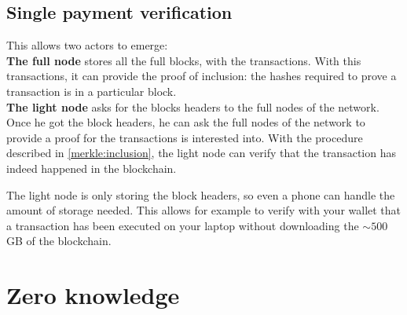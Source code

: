 \subsection{Single payment verification}
This allows two actors to emerge: \\
\textbf{The full node} stores all the full blocks, with the transactions. With this transactions, it can provide the proof of inclusion: the hashes required to prove a transaction is in a particular block. \\
\textbf{The light node } asks for the blocks headers to the full nodes of the network. Once he got the block headers, he can ask the full nodes of the network to provide a proof for the transactions is interested into. With the procedure described in \ref{merkle:inclusion}, the light node can verify that the transaction has indeed happened in the blockchain.

The light node is only storing the block headers, so even a phone can handle the amount of storage needed. This allows for example to verify with your wallet that a transaction has been executed  on your laptop without downloading the $\sim 500$GB of the blockchain.


\section{Zero knowledge}
